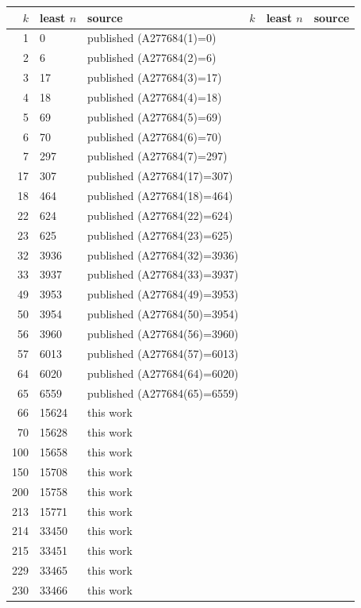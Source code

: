 \begin{tabular}{rllrll}
\toprule
$k$ & least $n$ & source & $k$ & least $n$ & source \\
\midrule
1 & 0 & published (A277684(1)=0) & & & \\
2 & 6 & published (A277684(2)=6) & & & \\
3 & 17 & published (A277684(3)=17) & & & \\
4 & 18 & published (A277684(4)=18) & & & \\
5 & 69 & published (A277684(5)=69) & & & \\
6 & 70 & published (A277684(6)=70) & & & \\
7 & 297 & published (A277684(7)=297) & & & \\
17 & 307 & published (A277684(17)=307) & & & \\
18 & 464 & published (A277684(18)=464) & & & \\
22 & 624 & published (A277684(22)=624) & & & \\
23 & 625 & published (A277684(23)=625) & & & \\
32 & 3936 & published (A277684(32)=3936) & & & \\
33 & 3937 & published (A277684(33)=3937) & & & \\
49 & 3953 & published (A277684(49)=3953) & & & \\
50 & 3954 & published (A277684(50)=3954) & & & \\
56 & 3960 & published (A277684(56)=3960) & & & \\
57 & 6013 & published (A277684(57)=6013) & & & \\
64 & 6020 & published (A277684(64)=6020) & & & \\
65 & 6559 & published (A277684(65)=6559) & & & \\
66 & 15624 & this work & & & \\
70 & 15628 & this work & & & \\
100 & 15658 & this work & & & \\
150 & 15708 & this work & & & \\
200 & 15758 & this work & & & \\
213 & 15771 & this work & & & \\
214 & 33450 & this work & & & \\
215 & 33451 & this work & & & \\
229 & 33465 & this work & & & \\
230 & 33466 & this work & & & \\
\bottomrule
\end{tabular}
